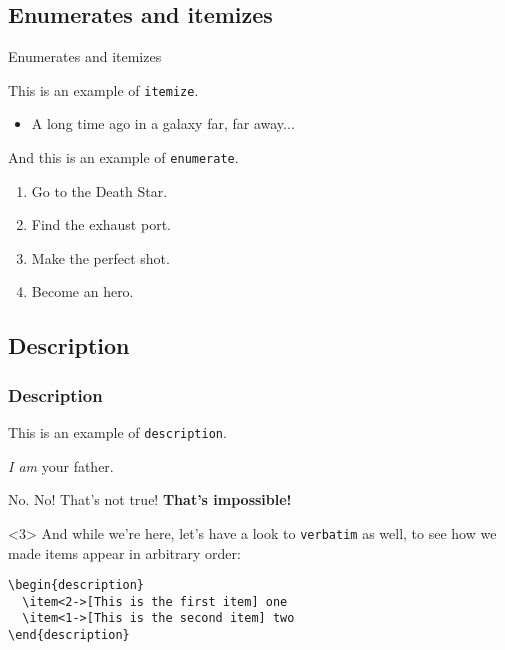 \documentclass[usenames,dvipsnames]{beamer}
\begin{document}
\subsection{Enumerates and itemizes}

\begin{frame}{Enumerates and itemizes}

This is an example of \texttt{itemize}.
\begin{itemize}
	\item A long time ago in a galaxy far, far away...
\end{itemize}
And this is an example of \texttt{enumerate}.

\begin{enumerate} 
  \item Go to the Death Star.
  \item Find the exhaust port.
  \item Make the perfect shot.
  \item Become an hero.
\end{enumerate}
\end{frame}

\subsection{Description}

\begin{frame}[fragile]
\frametitle{Description}
This is an example of \texttt{description}.

\begin{description}
\item<2->[Vader] \emph{I am} your father.
\item<1->[Luke] No. No! That's not true! \textbf{That's impossible!}
\end{description}

\begin{uncoverenv}<3>
  \vskip 0.5cm
  And while we're here, let's have a look to \texttt{verbatim} as well, to see how we made items appear in arbitrary order:
  \vskip 0.5cm
  \begin{verbatim}
\begin{description}
  \item<2->[This is the first item] one
  \item<1->[This is the second item] two
\end{description}
  \end{verbatim}
\end{uncoverenv}

\end{frame}
\end{document}
